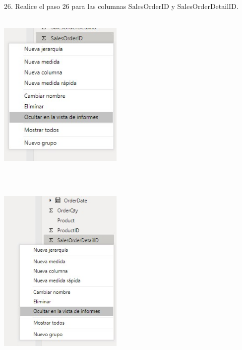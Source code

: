 \begin{flushleft}
\begin{itemize}
26. Realice el paso 26 para las columnas SalesOrderID y SalesOrderDetailID.\\

\textbf{ }\\
\begin{center}
	\includegraphics[width=6cm]{./Imagenes/image21} 
	\end{center}
\textbf{ }\\
\textbf{ }\\
\begin{center}
	\includegraphics[width=6cm]{./Imagenes/image22} 
	\end{center}
\textbf{ }\\

\textbf{ }\\
\textbf{ }\\
\textbf{ }\\
\textbf{ }\\
\textbf{ }\\
\textbf{ }\\
\textbf{ }\\
\textbf{ }\\
\textbf{ }\\
\textbf{ }\\
\textbf{ }\\


\end{itemize}
\end{flushleft}
